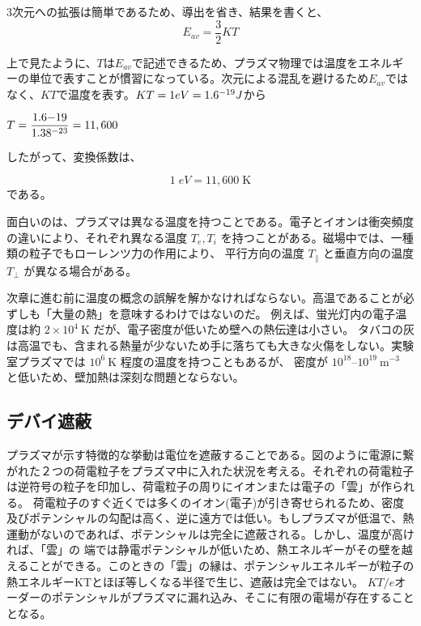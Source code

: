 \documentclass{ltjsarticle}
\numberwithin{equation}{section} %
\begin{document}
3次元への拡張は簡単であるため、導出を省き、結果を書くと、
\begin{equation}
  E_{av} = \frac{3}{2}KT
\end{equation}

上で見たように、$T$は$E_{av}$で記述できるため、プラズマ物理では温度をエネルギーの単位で表すことが慣習になっている。次元による混乱を避けるため$E_{av}$ではなく、$KT$で温度を表す。$KT = 1\space eV = 1.6 \time 10^{-19}\space J $から

\begin{center}
  $T= \dfrac{1.6\time 10{-19}}{1.38\time 10^{-23}} = {11,600}$
\end{center}
したがって、変換係数は、

\begin{equation}
  1\;\unit{eV}= {11,600}\; \unit{\kelvin}
\end{equation}
である。

面白いのは、プラズマは異なる温度を持つことである。電子とイオンは衝突頻度の違いにより、それぞれ異なる温度
  \( T_e, T_i \) を持つことがある。磁場中では、一種類の粒子でもローレンツ力の作用により、
  平行方向の温度 \( T_{\parallel} \) と垂直方向の温度 \( T_{\perp} \) が異なる場合がある。

次章に進む前に温度の概念の誤解を解かなければならない。高温であることが必ずしも「大量の熱」を意味するわけではないのだ。
例えば、蛍光灯内の電子温度は約 $2\times 10^4 \ \mathrm{K}$ だが、電子密度が低いため壁への熱伝達は小さい。
タバコの灰は高温でも、含まれる熱量が少ないため手に落ちても大きな火傷をしない。実験室プラズマでは $10^6 \ \mathrm{K}$ 程度の温度を持つこともあるが、
密度が $10^{18}$--$10^{19} \ \mathrm{m^{-3}}$ と低いため、壁加熱は深刻な問題とならない。


\subsection{デバイ遮蔽}
プラズマが示す特徴的な挙動は電位を遮蔽することである。図のように電源に繋がれた２つの荷電粒子をプラズマ中に入れた状況を考える。それぞれの荷電粒子は逆符号の粒子を印加し、荷電粒子の周りにイオンまたは電子の「雲」が作られる。
荷電粒子のすぐ近くでは多くのイオン(電子)が引き寄せられるため、密度及びポテンシャルの勾配は高く、逆に遠方では低い。もしプラズマが低温で、熱運動がないのであれば、ポテンシャルは完全に遮蔽される。しかし、温度が高ければ、「雲」の
端では静電ポテンシャルが低いため、熱エネルギーがその壁を越えることができる。このときの「雲」の縁は、ポテンシャルエネルギーが粒子の熱エネルギーKTとほぼ等しくなる半径で生じ、遮蔽は完全ではない。
$KT/e$オーダーのポテンシャルがプラズマに漏れ込み、そこに有限の電場が存在することとなる。
\end{document}
